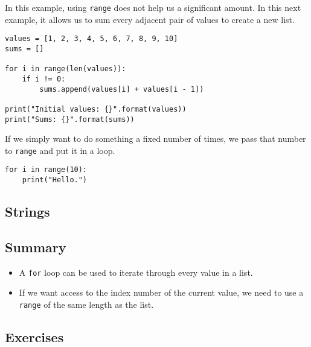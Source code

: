 \documentclass[11pt]{cselabheader}
\begin{document}
In this example, using \lstinline{range} does not help us a significant amount. In this next example, it allows us to sum every adjacent pair of values to create a new list.

\begin{lstlisting}[style=python]
values = [1, 2, 3, 4, 5, 6, 7, 8, 9, 10]
sums = []

for i in range(len(values)):
    if i != 0:
        sums.append(values[i] + values[i - 1])

print("Initial values: {}".format(values))
print("Sums: {}".format(sums))
\end{lstlisting}

If we simply want to do something a fixed number of times, we pass that number to \lstinline{range} and put it in a loop.

\begin{lstlisting}[style=python]
for i in range(10):
    print("Hello.")
\end{lstlisting}


\subsection{Strings}

\subsection{Summary}
\begin{itemize}
  \item A \lstinline{for} loop can be used to iterate through every value in a list.
  \item If we want access to the index number of the current value, we need to use a \lstinline{range} of the same length as the list.
\end{itemize}

\subsection{Exercises}
\label{subsec:forex}
\end{document}
